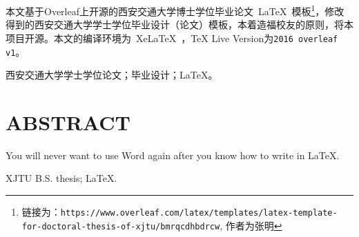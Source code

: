 
\clearpage
\titlespacing{\chapter}{0pt}{0mm}{5mm}



本文基于Overleaf上开源的西安交通大学博士学位毕业论文~\LaTeX~模板\footnote{链接为：\texttt{https://www.overleaf.com/latex/templates/latex-template-for-doctoral-thesis-of-xjtu/bmrqcdhbdrcw}, 作者为张明}，修改得到的西安交通大学学士学位毕业设计（论文）模板，本着造福校友的原则，将本项目开源。{\color{red}本文的编译环境为~XeLaTeX~，TeX Live Version为\texttt{2016 overleaf v1}}。

\vspace{\baselineskip}
 西安交通大学学士学位论文；毕业设计；\LaTeX。


\clearpage
{}
{}

\titlespacing{\chapter}{0pt}{0mm}{5mm}
\chapter*{ABSTRACT}

\noindent You will never want to use Word again after you know how to write in \LaTeX.

\vspace{\baselineskip}
 XJTU B.S. thesis; \LaTeX.


\titlespacing{\chapter}{0pt}{-6mm}{5mm}
\clearpage{\pagestyle{empty}\cleardoublepage}
